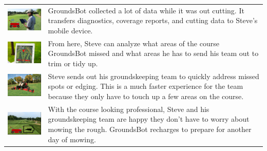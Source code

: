 \documentclass[12pt]{extarticle}
\begin{document}
\begin{table}[H]
   \def\arraystretch{4}
   \setlength\tabcolsep{8pt}


\begin{tabularx}{\textwidth}{cX}
\includegraphics[width=6cm, valign=t]{usecase2_2.png} &
GroundsBot collected a lot of data while it was out cutting. It transfers diagnostics, coverage reports, and cutting data to Steve’s mobile device.
\\
\includegraphics[width=6cm, valign=t]{usecase2_3.png} &
From here, Steve can analyze what areas of the course GroundsBot missed and what areas he has to send his team out to trim or tidy up.
\\
\includegraphics[width=6cm, valign=t]{usecase2_4.png} &
Steve sends out his groundskeeping team to quickly address missed spots or edging. This is a much faster experience for the team because they only have to touch up a few areas on the course.
\\
\includegraphics[width=6cm, valign=t]{usecase2_5.png} &
With the course looking professional, Steve and his groundskeeping team are happy they don’t have to worry about mowing the rough. GroundsBot recharges to prepare for another day of mowing.
\\

\end{tabularx}
\end{table}
\end{document}
